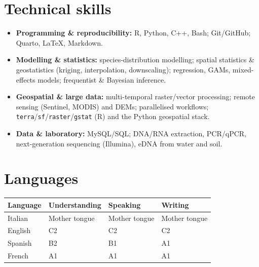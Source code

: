 \documentclass[11pt]{article}
\begin{document}
\section*{Technical skills}
\begin{itemize}[leftmargin=1.4em,itemsep=2pt]
\item \textbf{Programming \& reproducibility:} R, Python, C++, Bash; Git/GitHub; Quarto, LaTeX, Markdown.
\item \textbf{Modelling \& statistics:} species-distribution modelling; spatial statistics \& geostatistics (kriging, interpolation, downscaling); regression, GAMs, mixed-effects models; frequentist \& Bayesian inference.
\item \textbf{Geospatial \& large data:} multi-temporal raster/vector processing; remote sensing (Sentinel, MODIS) and DEMs; parallelised workflows; \texttt{terra}/\texttt{sf}/\texttt{raster}/\texttt{gstat} (R) and the Python geospatial stack.
\item \textbf{Data \& laboratory:} MySQL/SQL; DNA/RNA extraction, PCR/qPCR, next-generation sequencing (Illumina), eDNA from water and soil.
\end{itemize}

\section*{Languages}
\noindent
\begin{tabular}{@{}llll@{}}
\toprule
\textbf{Language} & \textbf{Understanding} & \textbf{Speaking} & \textbf{Writing}\\
\midrule
Italian & Mother tongue & Mother tongue & Mother tongue\\
English & C2 & C2 & C2\\
Spanish & B2 & B1 & A1\\
French & A1 & A1 & A1\\
\bottomrule
\end{tabular}
\end{document}
